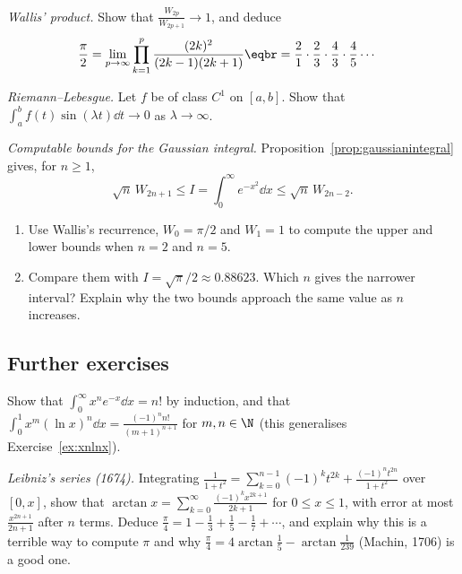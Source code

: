 \begin{exercise}[$\star\star$]\label{ex:wallisprod}
\emph{Wallis' product.} Show that $\displaystyle\frac{W_{2p}}{W_{2p+1}}\to1$, and deduce
\[
\begin{aligned}\frac\pi2&=\lim_{p\to\infty}\prod_{k=1}^p\frac{(2k)^2}{(2k-1)(2k+1)}\eqbr=\frac21\cdot\frac23\cdot\frac43\cdot\frac45\cdots\end{aligned}
\]
\end{exercise}

\begin{exercise}[$\star\star$]\label{ex:rl}
\emph{Riemann--Lebesgue.} Let $f$ be of class $C^1$ on $[a,b]$. Show that $\displaystyle\int_a^bf(t)\sin(\lambda t)\dd t\to0$ as $\lambda\to\infty$.
\end{exercise}

\begin{exercise}[$\star\star$]\label{ex:gaussian}
\emph{Computable bounds for the Gaussian integral.} Proposition~\ref{prop:gaussianintegral} gives, for $n\ge1$,
\[
\sqrt n\,W_{2n+1}\le I=\int_0^\infty e^{-x^2}\dd x\le\sqrt n\,W_{2n-2}.
\]
\begin{enumerate}[label=(\alph*)]
\item Use Wallis's recurrence, $W_0=\pi/2$ and $W_1=1$ to compute the upper and lower bounds when $n=2$ and $n=5$.
\item Compare them with $I=\sqrt\pi/2\approx0.88623$. Which $n$ gives the narrower interval? Explain why the two bounds approach the same value as $n$ increases.
\end{enumerate}
\end{exercise}

\subsection*{Further exercises}

\begin{exercise}[$\star$]\label{ex:xnex}
Show that $\displaystyle\int_0^\infty x^ne^{-x}\dd x=n!$ by induction, and that $\displaystyle\int_0^1x^m(\ln x)^n\dd x=\frac{(-1)^nn!}{(m+1)^{n+1}}$ for $m,n\in\N$ (this generalises Exercise~\ref{ex:xnlnx}).
\end{exercise}

\begin{exercise}[$\star$]\label{ex:leibnizpi}
\emph{Leibniz's series (1674).} Integrating $\frac1{1+t^2}=\sum_{k=0}^{n-1}(-1)^kt^{2k}+\frac{(-1)^nt^{2n}}{1+t^2}$ over $[0,x]$, show that $\arctan x=\sum_{k=0}^\infty\frac{(-1)^kx^{2k+1}}{2k+1}$ for $0\le x\le1$, with error at most $\frac{x^{2n+1}}{2n+1}$ after $n$ terms. Deduce $\frac\pi4=1-\frac13+\frac15-\frac17+\cdots$, and explain why this is a terrible way to compute $\pi$ and why $\frac\pi4=4\arctan\frac15-\arctan\frac1{239}$ (Machin, 1706) is a good one.
\end{exercise}

